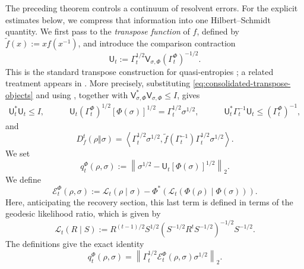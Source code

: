 \documentclass[11pt]{article}
\theoremstyle{remark}
\newcommand{\1}{\mathbbm{1}}
\begin{document}
The preceding theorem controls a continuum of resolvent errors.  For
the explicit estimates below, we compress that information into one
Hilbert--Schmidt quantity.  We first pass to the \emph{transpose
function} of $f$, defined by
$\widetilde f(x):=xf(x^{-1})$, and introduce the comparison
contraction
\begin{equation}
 \mathsf U_t:=\Gamma_t^{1/2}
 \mathsf V_{\sigma,\Phi}(\Gamma_t^\Phi)^{-1/2}.
 \label{eq:consolidated-transpose-objects}
\end{equation}
This is the standard transpose construction for quasi-entropies
\cite[Sections~2 and~7]{carlen2018recovery}; a related treatment appears in
\cite[Theorem~6.1]{bluhm2020strengthened}.  More precisely,
substituting \eqref{eq:consolidated-transpose-objects} and using
, together with
$\mathsf V_{\sigma,\Phi}^*\mathsf V_{\sigma,\Phi}\leq I$, gives
\begin{align}
 \mathsf U_t^*\mathsf U_t\leq I,\quad \qquad
 \mathsf U_t(\Gamma_t^\Phi)^{1/2}[\Phi(\sigma)]^{1/2}
 =\Gamma_t^{1/2}\sigma^{1/2}, \quad \qquad
 \mathsf U_t^*\Gamma_t^{-1}\mathsf U_t
 \leq(\Gamma_t^\Phi)^{-1},
 \label{eq:consolidated-transpose-relations}
\end{align}
and
\begin{equation}
 D_f^t(\rho\Vert\sigma)
 =\left\langle\Gamma_t^{1/2}\sigma^{1/2},
 \widetilde f(\Gamma_t^{-1})
 \Gamma_t^{1/2}\sigma^{1/2}\right\rangle.
\end{equation}
We set
\begin{equation}
 q_t^\Phi(\rho,\sigma)
 :=\left\lVert\sigma^{1/2}
 -\mathsf U_t[\Phi(\sigma)]^{1/2}\right\rVert_2.
 \label{eq:consolidated-qt}
\end{equation}
We define
\begin{equation}
 \mathcal E_t^\Phi(\rho,\sigma)
 :=\mathcal L_t(\rho\mid\sigma)
 -\Phi^*\!\left(\mathcal L_t(\Phi(\rho)\mid\Phi(\sigma))\right).
 \label{eq:consolidated-recovery-residual}
\end{equation}
Here, anticipating the recovery section, this last term is defined in terms of the geodesic likelihood
ratio, which is given by
\begin{equation}
 \mathcal L_t(R\mid S)
 :=R^{(t-1)/2}S^{1/2}
 (S^{-1/2}R^tS^{-1/2})^{-1/2}S^{-1/2}.
\end{equation}
The definitions give the exact identity
\begin{equation}
 q_t^\Phi(\rho,\sigma)
 =\left\lVert\Gamma_t^{1/2}
 \mathcal E_t^\Phi(\rho,\sigma)\sigma^{1/2}\right\rVert_2.
 \label{eq:consolidated-qt-likelihood}
\end{equation}
\end{document}
